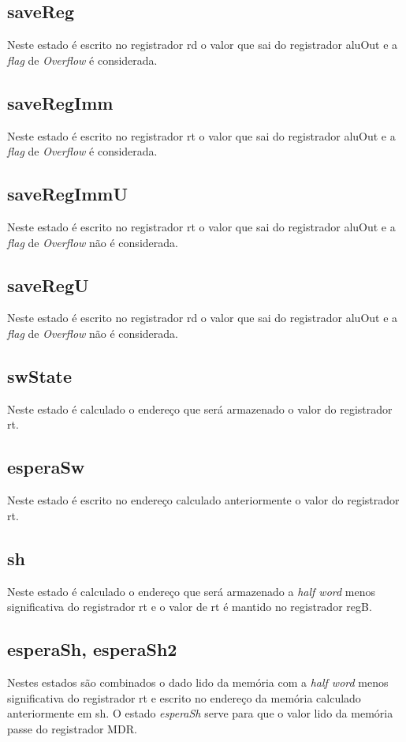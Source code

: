 \documentclass{article}
\begin{document}
    \subsection{saveReg}
    Neste estado é escrito no registrador rd o valor que sai do registrador aluOut e a {\it flag} de {\it Overflow} é considerada.
    
    \subsection{saveRegImm}
    Neste estado é escrito no registrador rt o valor que sai do registrador aluOut e a {\it flag} de {\it Overflow} é considerada.
    
    \subsection{saveRegImmU}
    Neste estado é escrito no registrador rt o valor que sai do registrador aluOut e a {\it flag} de {\it Overflow} não é considerada.
    
    \subsection{saveRegU}
    Neste estado é escrito no registrador rd o valor que sai do registrador aluOut e a {\it flag} de {\it Overflow} não é considerada.
    
    \subsection{swState}
    Neste estado é calculado o endereço que será armazenado o valor do registrador rt.
    
    \subsection{esperaSw}
    Neste estado é escrito no endereço calculado anteriormente o valor do registrador rt.
    
    \subsection{sh}
    Neste estado é calculado o endereço que será armazenado a {\it half word} menos significativa do registrador rt e o valor de rt é mantido no registrador regB.
    
    \subsection{esperaSh, esperaSh2}
    Nestes estados são combinados o dado lido da memória com a {\it half word} menos significativa do registrador rt e escrito no endereço da memória calculado anteriormente em sh. O estado {\it esperaSh} serve para que o valor lido da memória passe do registrador MDR.
    
\end{document}
